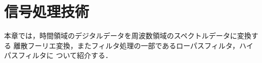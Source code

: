 \chapter{信号処理技術}


本章では，時間領域のデジタルデータを周波数領域のスペクトルデータに変換する
離散フーリエ変換，またフィルタ処理の一部であるローパスフィルタ，ハイパスフィルタに
ついて紹介する．


